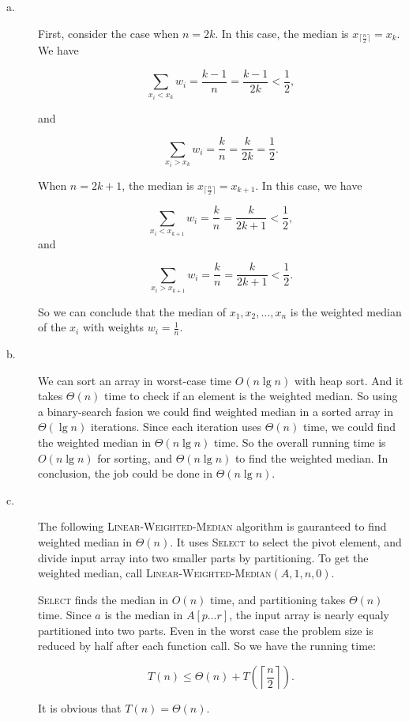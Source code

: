 \answer
\begin{description}
\item[a. \hspace{9pt}] First, consider the case when $n = 2k$. In this case, the median is $x_{\lceil\frac{n}{2}\rceil} = x_k$. We have

$$\sum_{x_i < x_k}w_i = \frac{k - 1}{n} = \frac{k - 1}{2k} < \frac{1}{2},$$

and

$$\sum_{x_i > x_k}w_i = \frac{k}{n} = \frac{k}{2k} = \frac{1}{2}.$$

When $n = 2k + 1$, the median is $x_{\lceil\frac{n}{2}\rceil} = x_{k+1}$. In this case, we have

$$ \sum_{x_i < x_{k + 1}}w_i = \frac{k}{n} = \frac{k}{2k + 1} < \frac{1}{2}, $$
and

$$\sum_{x_i > x_{k +1}} w_i = \frac{k}{n} = \frac{k}{2k + 1} < \frac{1}{2}.$$

So we can conclude that the median of $x_1, x_2, \ldots, x_n$ is the weighted median of the $x_i$ with weights $w_i = \frac{1}{n}$.

\item[b. \hspace{9pt}] We can sort an array in worst-case time $O(n\lg n)$ with heap sort. And it takes $\Theta(n)$ time to check if an element is the weighted median.
So using a binary-search fasion we could find weighted median in a  sorted array in $\Theta(\lg n)$ iterations. Since each iteration uses $\Theta(n)$ time, we could find the
weighted median in $\Theta(n \lg n)$ time. So the overall running time is $O(n\lg n)$ for sorting, and $\Theta(n \lg n)$ to find the weighted median. In conclusion, the 
job could be done in $\Theta(n \lg n)$.


\item[c. \hspace{9pt}] The following \textsc{Linear-Weighted-Median} algorithm is gauranteed to find weighted median in $\Theta(n)$. It uses \textsc{Select} to select the pivot element, and
divide input array into two smaller parts by partitioning. To get the weighted median, call \textsc{Linear-Weighted-Median}$(A, 1, n, 0)$.

\textsc{Select} finds the median in $O(n)$ time, and partitioning takes $\Theta(n)$ time. Since $a$ is the median in $A[p\ldots r]$, the input array is nearly
equaly partitioned into two parts. Even in the worst case the problem size is reduced by half after each function call. So we have the running time:

$$T(n) \leq \Theta(n) + T\left(\left\lceil\frac{n}{2}\right\rceil\right).$$

It is obvious that $T(n) = \Theta(n)$.

\end{description}

